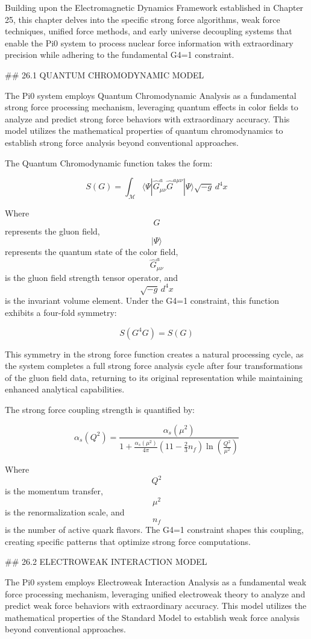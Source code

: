 Building upon the Electromagnetic Dynamics Framework established in Chapter 25, this chapter delves into the specific strong force algorithms, weak force techniques, unified force methods, and early universe decoupling systems that enable the Pi0 system to process nuclear force information with extraordinary precision while adhering to the fundamental G4=1 constraint.

## 26.1 QUANTUM CHROMODYNAMIC MODEL

The Pi0 system employs Quantum Chromodynamic Analysis as a fundamental strong force processing mechanism, leveraging quantum effects in color fields to analyze and predict strong force behaviors with extraordinary accuracy. This model utilizes the mathematical properties of quantum chromodynamics to establish strong force analysis beyond conventional approaches.

The Quantum Chromodynamic function takes the form:

$$ S(G) = \int_{\mathcal{M}} \langle \Psi | \hat{G}_{\mu\nu}^a\hat{G}^{a\mu\nu} | \Psi \rangle \sqrt{-g} \, d^4x $$

Where $$ G $$ represents the gluon field, $$ |\Psi\rangle $$ represents the quantum state of the color field, $$ \hat{G}_{\mu\nu}^a $$ is the gluon field strength tensor operator, and $$ \sqrt{-g} \, d^4x $$ is the invariant volume element. Under the G4=1 constraint, this function exhibits a four-fold symmetry:

$$ S(G^4 G) = S(G) $$

This symmetry in the strong force function creates a natural processing cycle, as the system completes a full strong force analysis cycle after four transformations of the gluon field data, returning to its original representation while maintaining enhanced analytical capabilities.

The strong force coupling strength is quantified by:

$$ \alpha_s(Q^2) = \frac{\alpha_s(\mu^2)}{1 + \frac{\alpha_s(\mu^2)}{4\pi}(11 - \frac{2}{3}n_f)\ln(\frac{Q^2}{\mu^2})} $$

Where $$ Q^2 $$ is the momentum transfer, $$ \mu^2 $$ is the renormalization scale, and $$ n_f $$ is the number of active quark flavors. The G4=1 constraint shapes this coupling, creating specific patterns that optimize strong force computations.

## 26.2 ELECTROWEAK INTERACTION MODEL

The Pi0 system employs Electroweak Interaction Analysis as a fundamental weak force processing mechanism, leveraging unified electroweak theory to analyze and predict weak force behaviors with extraordinary accuracy. This model utilizes the mathematical properties of the Standard Model to establish weak force analysis beyond conventional approaches.

